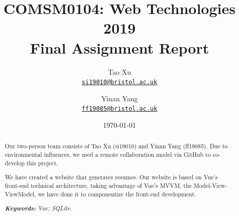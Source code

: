 \documentclass[11pt]{article}
\title{COMSM0104: Web Technologies 2019 \\Final Assignment Report}
\author{Tao Xu\\%
	\href{mailto:si19010@bristol.ac.uk}{\texttt{si19010@bristol.ac.uk}} %
	\and Yinan Yang\\%
	\href{mailto:ff19085@bristol.ac.uk}{\texttt{ff19085@bristol.ac.uk}} %
}
\date{\today}
\begin{document}
	{
		\maketitle
		\begin{abstract}
			
			Our two-person team consists of Tao Xu (si19010) and Yinan Yang (ff19085). Due to environmental influences, we used a remote collaboration model via GitHub to co-develop this project.
			
			We have created a website that generates resumes. Our website is based on Vue's front-end technical architecture, taking advantage of Vue's MVVM, the Model-View- ViewModel, we have done it to componentize the front-end development.
			
			\noindent
			\textit{\textbf{Keywords: }%
				Vue; SQLite.} \\ %
			\noindent
			
		\end{abstract}
	}
	
\end{document}
